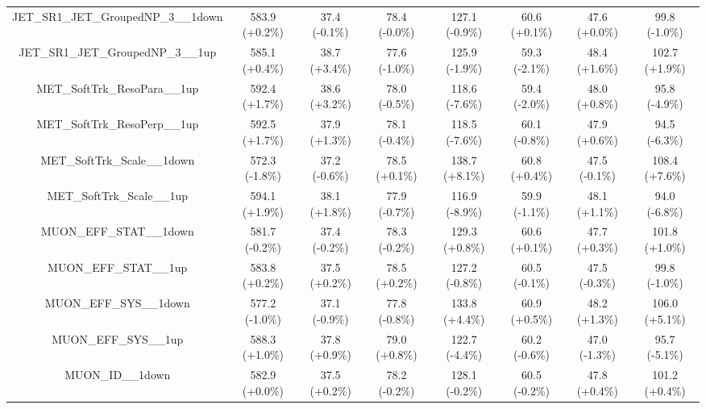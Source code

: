 \begin{table}[htbp!]
\begin{tiny}
\begin{center}
\begin{tabular}{c|c|c|c||c|c|c|c}
JET\_SR1\_JET\_GroupedNP\_3\_\_1down                         & 583.9     (+0.2\%) & 37.4      (-0.1\%) & 78.4      (-0.0\%) & 127.1     (-0.9\%) & 60.6      (+0.1\%) & 47.6      (+0.0\%) & 99.8      (-1.0\%) \\ 
JET\_SR1\_JET\_GroupedNP\_3\_\_1up                           & 585.1     (+0.4\%) & 38.7      (+3.4\%) & 77.6      (-1.0\%) & 125.9     (-1.9\%) & 59.3      (-2.1\%) & 48.4      (+1.6\%) & 102.7     (+1.9\%) \\ 
MET\_SoftTrk\_ResoPara\_\_1up                                & 592.4     (+1.7\%) & 38.6      (+3.2\%) & 78.0      (-0.5\%) & 118.6     (-7.6\%) & 59.4      (-2.0\%) & 48.0      (+0.8\%) & 95.8      (-4.9\%) \\ 
MET\_SoftTrk\_ResoPerp\_\_1up                                & 592.5     (+1.7\%) & 37.9      (+1.3\%) & 78.1      (-0.4\%) & 118.5     (-7.6\%) & 60.1      (-0.8\%) & 47.9      (+0.6\%) & 94.5      (-6.3\%) \\ 
MET\_SoftTrk\_Scale\_\_1down                                 & 572.3     (-1.8\%) & 37.2      (-0.6\%) & 78.5      (+0.1\%) & 138.7     (+8.1\%) & 60.8      (+0.4\%) & 47.5      (-0.1\%) & 108.4     (+7.6\%) \\ 
MET\_SoftTrk\_Scale\_\_1up                                   & 594.1     (+1.9\%) & 38.1      (+1.8\%) & 77.9      (-0.7\%) & 116.9     (-8.9\%) & 59.9      (-1.1\%) & 48.1      (+1.1\%) & 94.0      (-6.8\%) \\ 
MUON\_EFF\_STAT\_\_1down                                     & 581.7     (-0.2\%) & 37.4      (-0.2\%) & 78.3      (-0.2\%) & 129.3     (+0.8\%) & 60.6      (+0.1\%) & 47.7      (+0.3\%) & 101.8     (+1.0\%) \\ 
MUON\_EFF\_STAT\_\_1up                                       & 583.8     (+0.2\%) & 37.5      (+0.2\%) & 78.5      (+0.2\%) & 127.2     (-0.8\%) & 60.5      (-0.1\%) & 47.5      (-0.3\%) & 99.8      (-1.0\%) \\ 
MUON\_EFF\_SYS\_\_1down                                      & 577.2     (-1.0\%) & 37.1      (-0.9\%) & 77.8      (-0.8\%) & 133.8     (+4.4\%) & 60.9      (+0.5\%) & 48.2      (+1.3\%) & 106.0     (+5.1\%) \\ 
MUON\_EFF\_SYS\_\_1up                                        & 588.3     (+1.0\%) & 37.8      (+0.9\%) & 79.0      (+0.8\%) & 122.7     (-4.4\%) & 60.2      (-0.6\%) & 47.0      (-1.3\%) & 95.7      (-5.1\%) \\ 
MUON\_ID\_\_1down                                            & 582.9     (+0.0\%) & 37.5      (+0.2\%) & 78.2      (-0.2\%) & 128.1     (-0.2\%) & 60.5      (-0.2\%) & 47.8      (+0.4\%) & 101.2     (+0.4\%) \\ 

\end{tabular}
\end{center}
\end{tiny}
\end{table}
